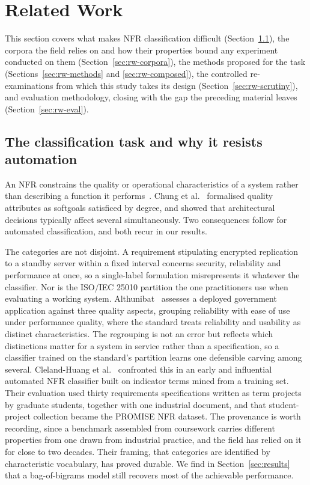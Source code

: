 \documentclass[11pt,a4paper]{article}
\begin{document}
\section{Related Work}
\label{sec:related}

This section covers what makes NFR classification difficult
(Section~\ref{sec:rw-task}), the corpora the field relies on and how their properties bound
any experiment conducted on them (Section~\ref{sec:rw-corpora}), the methods proposed for the
task (Sections~\ref{sec:rw-methods} and \ref{sec:rw-composed}), the controlled
re-examinations from which this study takes its design (Section~\ref{sec:rw-scrutiny}), and
evaluation methodology, closing with the gap the preceding material leaves
(Section~\ref{sec:rw-eval}).

\subsection{The classification task and why it resists automation}
\label{sec:rw-task}

An NFR constrains the quality or operational characteristics of a system rather than
describing a function it performs~\cite{glinz2007}. Chung et al.~\cite{chung2000}
formalised quality attributes as softgoals satisficed by degree, and showed that
architectural decisions typically affect several simultaneously. Two consequences follow
for automated classification, and both recur in our results.

The categories are not disjoint. A requirement stipulating encrypted replication to a
standby server within a fixed interval concerns security, reliability and performance at
once, so a single-label formulation misrepresents it whatever the classifier. Nor is the
ISO/IEC 25010 partition the one practitioners use when evaluating a working system.
Althunibat~\cite{althunibat2025} assesses a deployed government application against three
quality aspects, grouping reliability with ease of use under performance quality, where the
standard treats reliability and usability as distinct characteristics. The regrouping is not
an error but reflects which distinctions matter for a system in service rather than a
specification, so a classifier trained on the standard's partition learns one defensible
carving among several. Cleland-Huang et al.~\cite{clelandhuang2007} confronted this in an early and influential
automated NFR classifier built on indicator terms mined from a training set. Their
evaluation used thirty requirements specifications written as term projects by graduate
students, together with one industrial document, and that student-project collection became
the PROMISE NFR dataset. The provenance is worth recording, since a benchmark assembled from
coursework carries different properties from one drawn from industrial practice, and the
field has relied on it for close to two decades. Their framing, that categories
are identified by characteristic vocabulary, has proved durable. We find in Section~\ref{sec:results} that a bag-of-bigrams model still recovers most of the achievable
performance.
\end{document}
